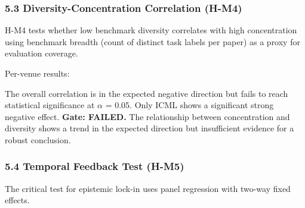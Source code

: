 \subsubsection{5.3 Diversity-Concentration Correlation (H-M4)}

H-M4 tests whether low benchmark diversity correlates with high concentration using benchmark breadth (count of distinct task labels per paper) as a proxy for evaluation coverage.

\begin{table}[htbp]
\centering
{}
\end{table}

Per-venue results:

\begin{table}[htbp]
\centering
{}
\end{table}

The overall correlation is in the expected negative direction but fails to reach statistical significance at $\alpha$ = 0.05. Only ICML shows a significant strong negative effect. \textbf{Gate: FAILED.} The relationship between concentration and diversity shows a trend in the expected direction but insufficient evidence for a robust conclusion.

\subsubsection{5.4 Temporal Feedback Test (H-M5)}

The critical test for epistemic lock-in uses panel regression with two-way fixed effects.

\begin{table}[htbp]
\centering
{}
\end{table}

